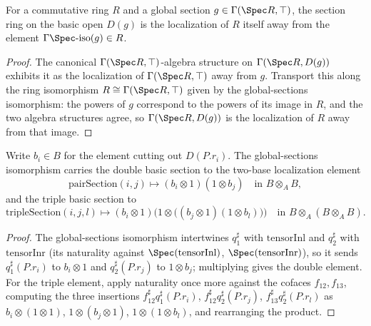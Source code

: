 \begin{theorem}
  \label{pa-thm:isLocalization_away_sections}
  \leanok

  For a commutative ring \(R\) and a global section \(g \in \Gamma(\Spec R, \top)\), the
  section ring on the basic open \(D(g)\) is the localization of \(R\) itself away from the
  element \(\Gamma\Spec\text{-}\mathrm{iso}(g) \in R\).
\end{theorem}
\begin{proof}
  \leanok
  The canonical \(\Gamma(\Spec R, \top)\)-algebra structure on \(\Gamma(\Spec R, D(g))\)
  exhibits it as the localization of \(\Gamma(\Spec R, \top)\) away from \(g\). Transport this
  along the ring isomorphism \(R \cong \Gamma(\Spec R, \top)\) given by the global-sections
  isomorphism: the powers of \(g\) correspond to the powers of its image in \(R\), and the two
  algebra structures agree, so \(\Gamma(\Spec R, D(g))\) is the localization of \(R\) away from
  that image.
\end{proof}

\begin{lemma}
  \label{pa-lem:GammaSpecIso_hom_pairTripleSection}
  \leanok

  Write \(b_i \in B\) for the element cutting out \(D(P.r_i)\). The global-sections
  isomorphism carries the double basic section to the two-base localization element
  \[
    \mathrm{pairSection}(i, j) \mapsto (b_i \otimes 1)(1 \otimes b_j)
    \quad\text{in } B \otimes_A B ,
  \]
  and the triple basic section to
  \[
    \mathrm{tripleSection}(i, j, l) \mapsto
      (b_i \otimes 1)\bigl(1 \otimes \bigl((b_j \otimes 1)(1 \otimes b_l)\bigr)\bigr)
    \quad\text{in } B \otimes_A (B \otimes_A B) .
  \]
\end{lemma}
\begin{proof}
  \leanok
  The global-sections isomorphism intertwines \(q_1^{\sharp}\) with \(\mathrm{tensorInl}\) and
  \(q_2^{\sharp}\) with \(\mathrm{tensorInr}\) (its naturality against
  \(\Spec(\mathrm{tensorInl})\), \(\Spec(\mathrm{tensorInr})\)), so it sends
  \(q_1^{\sharp}(P.r_i)\) to \(b_i \otimes 1\) and \(q_2^{\sharp}(P.r_j)\) to \(1 \otimes b_j\);
  multiplying gives the double element. For the triple element, apply naturality once more
  against the cofaces \(f_{12}, f_{13}\), computing the three insertions
  \(f_{12}^{\sharp} q_1^{\sharp}(P.r_i)\), \(f_{12}^{\sharp} q_2^{\sharp}(P.r_j)\),
  \(f_{13}^{\sharp} q_2^{\sharp}(P.r_l)\) as \(b_i \otimes (1 \otimes 1)\),
  \(1 \otimes (b_j \otimes 1)\), \(1 \otimes (1 \otimes b_l)\), and rearranging the product.
\end{proof}

